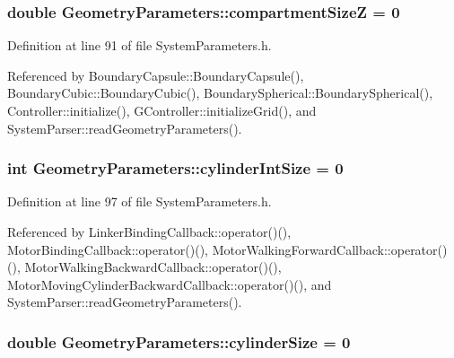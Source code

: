 \hypertarget{structGeometryParameters_a6c0c575c958ad3c0625f63ae3302575c}{
\subsubsection[{compartment\+Size\+Z}]{\setlength{\rightskip}{0pt plus 5cm}double Geometry\+Parameters\+::compartment\+Size\+Z = 0}}\label{structGeometryParameters_a6c0c575c958ad3c0625f63ae3302575c}


Definition at line 91 of file System\+Parameters.\+h.



Referenced by Boundary\+Capsule\+::\+Boundary\+Capsule(), Boundary\+Cubic\+::\+Boundary\+Cubic(), Boundary\+Spherical\+::\+Boundary\+Spherical(), Controller\+::initialize(), G\+Controller\+::initialize\+Grid(), and System\+Parser\+::read\+Geometry\+Parameters().

\hypertarget{structGeometryParameters_a4ea73a722482f66eeaedfb57435f35d1}{
\subsubsection[{cylinder\+Int\+Size}]{\setlength{\rightskip}{0pt plus 5cm}int Geometry\+Parameters\+::cylinder\+Int\+Size = 0}}\label{structGeometryParameters_a4ea73a722482f66eeaedfb57435f35d1}


Definition at line 97 of file System\+Parameters.\+h.



Referenced by Linker\+Binding\+Callback\+::operator()(), Motor\+Binding\+Callback\+::operator()(), Motor\+Walking\+Forward\+Callback\+::operator()(), Motor\+Walking\+Backward\+Callback\+::operator()(), Motor\+Moving\+Cylinder\+Backward\+Callback\+::operator()(), and System\+Parser\+::read\+Geometry\+Parameters().

\hypertarget{structGeometryParameters_ab269206056f9e28193129ca5d31d8b30}{
\subsubsection[{cylinder\+Size}]{\setlength{\rightskip}{0pt plus 5cm}double Geometry\+Parameters\+::cylinder\+Size = 0}}\label{structGeometryParameters_ab269206056f9e28193129ca5d31d8b30}


